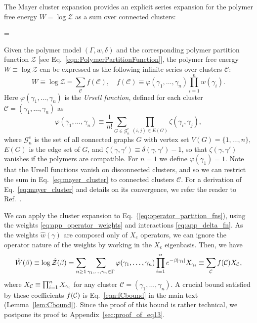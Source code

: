 The Mayer cluster expansion \cite{Friedli_Velenik_2017,KoteckyPreiss1986,Penrose1967} provides an explicit series expansion for the polymer free energy $W = \log \mathcal{Z}$ as a sum over connected clusters:
\begin{theorem} \label{theorem:Mayer}=

Given the polymer model $(\Gamma, w, \delta)$ and the corresponding polymer partition function $\mathcal{Z}$ [see Eq.~\eqref{eqn:PolymerPartitionFunction}], the polymer free energy $W \equiv \log \mathcal{Z}$ can be expressed as the following infinite series over clusters $\mathcal{C}$:
\begin{equation}
\label{eq:mayer_cluster}
    W \equiv \log \mathcal{Z} = \sum_{\mathcal{C}} f(\mathcal{C}), \quad f(\mathcal{C}) \equiv \varphi(\gamma_1 , \ldots , \gamma_n ) \prod_{i = 1}^n w(\gamma_i) .
\end{equation}
Here $\varphi(\gamma_1 , \ldots , \gamma_n)$ is the \emph{Ursell function}, defined for each cluster $\mathcal{C} = (\gamma_1 , \ldots , \gamma_n)$ as
\begin{equation}
\label{eq:ursell}
    \varphi(\gamma_1, \dots, \gamma_n) \equiv \frac{1}{n!} \sum_{G \in \mathcal{G}^c_n} \prod_{(i,j) \in E(G)} \zeta(\gamma_i,\gamma_j) ,
\end{equation}
where $\mathcal{G}^c_n$ is the set of all connected graphs $G$ with vertex set $V(G) = \{ 1, \ldots , n \}$, $E(G)$ is the edge set of $G$, and $\zeta(\gamma, \gamma') \equiv \delta(\gamma, \gamma') - 1$, so that $\zeta(\gamma, \gamma')$ vanishes if the polymers are compatible. For $n=1$ we define $\varphi(\gamma_1) = 1$. Note that the Ursell functions vanish on disconnected clusters, and so we can restrict the sum in Eq.~\eqref{eq:mayer_cluster} to connected clusters $\mathcal{C}$. For a derivation of Eq.~\eqref{eq:mayer_cluster} and details on its convergence, we refer the reader to Ref.~.
\end{theorem}


We can apply the cluster expansion to Eq.~(\ref{eq:operator_partition_fns}), using the weights \eqref{eq:app_operator_weights} and interactions \eqref{eq:app_delta_fn}. As the weights $\hat{w}(\gamma)$ are composed only of $X_e$ operators, we can ignore the operator nature of the weights by working in the $X_e$ eigenbasis. Then, we have 
\begin{equation}
\label{eq:cluster_expansion_op}
    \hat{W}(\beta) \equiv \log \hat{\mathcal{Z}}(\beta) = \sum_{n \geq 1} \sum_{\gamma_1, \dots, \gamma_n \in \Gamma} \varphi(\gamma_1, \dots, \gamma_n) \prod_{i=1}^n e^{-\beta \abs{\gamma_i}} X_{\gamma_i} \equiv \sum_{\mathcal{C}} f(\mathcal{C}) X_{\mathcal{C}},
\end{equation}
where $X_{\mathcal{C}} \equiv\prod_{i=1}^n X_{\gamma_i}$ for any cluster $\mathcal{C} = (\gamma_1 , \ldots , \gamma_n)$. A crucial bound satisfied by these coefficients $f(\mathcal{C})$ is Eq.~\eqref{eqn:fCbound} in the main text (Lemma~\ref{lem:Cbound}). Since the proof of this bound is rather technical, we postpone its proof to Appendix~\ref{sec:proof_of_eq13}.







